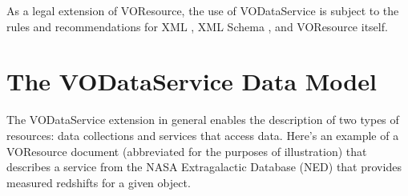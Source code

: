 \documentclass[11pt,a4paper]{ivoa}
\begin{document}
As a legal extension of VOResource, the use
of VODataService is subject to the rules and recommendations for XML
\citep{std:XML}, XML Schema \citep{std:XSD},
and VOResource itself.  


\section{The VODataService Data Model}


The VODataService extension in general enables the description of two
types of resources:  data collections and services that access data.
Here's an example of a VOResource document (abbreviated for the
purposes of illustration) that describes a service from the NASA
Extragalactic Database (NED) that provides measured redshifts for a
given object.
\end{document}
